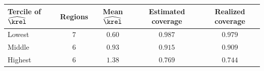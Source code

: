\begin{tabular}{lcccc}
\toprule
Tercile of $\widehat\krel$ & Regions & Mean $\widehat\krel$ & Estimated coverage & Realized coverage \\
\midrule
Lowest & $7$ & $0.60$ & $0.987$ & $0.979$ \\
Middle & $6$ & $0.93$ & $0.915$ & $0.909$ \\
Highest & $6$ & $1.38$ & $0.769$ & $0.744$ \\
\bottomrule
\end{tabular}
